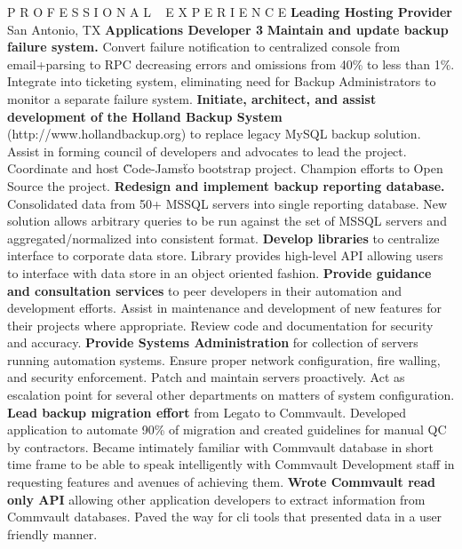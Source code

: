  
\pagebreak
\begin{rubric}{P R O F E S S I O N A L ~ E X P E R I E N C E}
        \entry*\textbf{Leading Hosting Provider} San Antonio, TX
            \textbf{Applications Developer 3}
        \entry*\textbf{Maintain and update backup failure system.} Convert failure notification to centralized console from email+parsing to RPC decreasing errors and omissions from 40\% to less than 1\%. Integrate into ticketing system, eliminating need for Backup Administrators to monitor a separate failure system.
        \entry*\textbf{Initiate, architect, and assist development of the Holland Backup System} (http://www.hollandbackup.org) to replace legacy MySQL backup solution. Assist in forming council of developers and advocates to lead the project. Coordinate and host \"Code-Jams\" to bootstrap project. Champion efforts to Open Source the project.
        \entry*\textbf{Redesign and implement backup reporting database.} Consolidated data from 50+ MSSQL servers into single reporting database. New solution allows arbitrary queries to be run against the set of MSSQL servers and aggregated/normalized into consistent format.
        \entry*\textbf{Develop libraries} to centralize interface to corporate data store. Library provides high-level API allowing users to interface with data store in an object oriented fashion.
        \entry*\textbf{Provide guidance and consultation services} to peer developers in their automation and development efforts. Assist in maintenance and development of new features for their projects where appropriate. Review code and documentation for security and accuracy.
        \entry*\textbf{Provide Systems Administration} for collection of servers running automation systems. Ensure proper network configuration, fire walling, and security enforcement. Patch and maintain servers proactively. Act as escalation point for several other departments on matters of system configuration.
        \entry*\textbf{Lead backup migration effort} from Legato to Commvault. Developed application to automate 90\% of migration and created guidelines for manual QC by contractors. Became intimately familiar with Commvault database in short time frame to be able to speak intelligently with Commvault Development staff in requesting features and avenues of achieving them.
        \entry*\textbf{Wrote Commvault read only API} allowing other application developers to extract information from Commvault databases.  Paved the way for cli tools that presented data in a user friendly manner.

\end{rubric}
